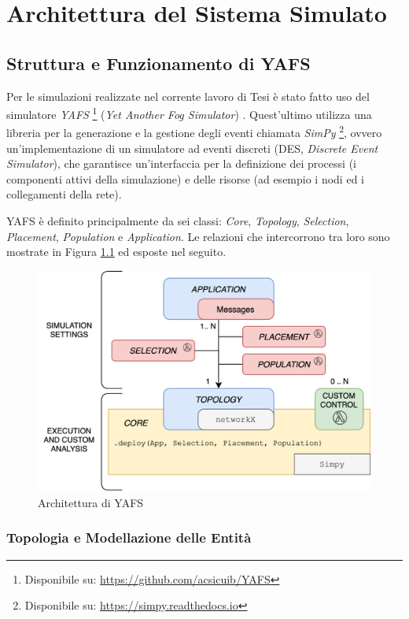 \chapter{Architettura del Sistema Simulato}	

\section{Struttura e Funzionamento di YAFS}

Per le simulazioni realizzate nel corrente lavoro di Tesi è stato fatto uso del simulatore \textit{YAFS} \footnote{Disponibile su: \url{https://github.com/acsicuib/YAFS}} (\textit{Yet Another Fog Simulator}) \cite{YAFSSimulator}. Quest'ultimo utilizza una libreria per la generazione e la gestione degli eventi chiamata \textit{SimPy} \footnote{Disponibile su: \url{https://simpy.readthedocs.io}}, ovvero un'implementazione di un simulatore ad eventi discreti (DES, \textit{Discrete Event Simulator}), che garantisce un'interfaccia per la definizione dei processi (i componenti attivi della simulazione) e delle risorse (ad esempio i nodi ed i collegamenti della rete).

YAFS è definito principalmente da sei classi: \textit{Core}, \textit{Topology}, \textit{Selection}, \textit{Placement}, \textit{Population} e \textit{Application}. Le relazioni che intercorrono tra loro sono mostrate in Figura \ref{fig:YAFS_classes} ed esposte nel seguito.

\begin{figure}[!ht]
  \includegraphics[width=12cm]{images/YAFS_classes}
  \centering
  \caption[Architettura di YAFS]{Architettura di YAFS}
  \label{fig:YAFS_classes}
\end{figure}

\subsection{Topologia e Modellazione delle Entità}

